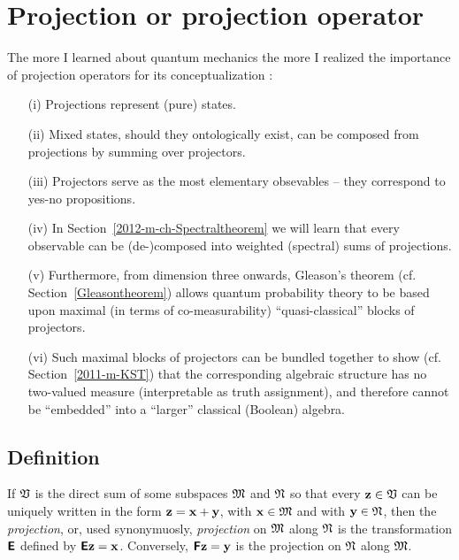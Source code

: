 \section{Projection or projection operator}
\label{2011-m-projec}

The more I learned about quantum mechanics the more
I realized the importance of projection operators for its conceptualization \cite{v-neumann-49,v-neumann-55,birkhoff-36}:
\begin{itemize}
\item[(i)]
Projections represent (pure) states.
\item[(ii)]
Mixed states, should they ontologically exist, can be composed from projections by summing over projectors.
\item[(iii)]
Projectors serve as the most elementary obsevables -- they correspond to yes-no propositions.
\item[(iv)]
In Section~\ref{2012-m-ch-Spectraltheorem} we will learn
that every observable can be (de-)composed into weighted (spectral) sums of projections.
\item[(v)]
Furthermore, from dimension three onwards, Gleason's theorem (cf. Section~\ref{Gleasontheorem}) allows
quantum probability theory to be based upon maximal (in terms of co-measurability) ``quasi-classical''
blocks of projectors.
\item[(vi)]
Such maximal blocks of projectors can be bundled together to show (cf. Section~\ref{2011-m-KST})
that the corresponding algebraic
structure has no two-valued measure (interpretable as truth assignment), and
therefore cannot be ``embedded'' into a ``larger'' classical (Boolean) algebra.
\end{itemize}



\subsection{Definition}
If ${\frak V}$ is the direct sum of some subspaces
${\frak M}$
and
${\frak N}$
so that every ${\bf z} \in {\frak V}$ can be uniquely written in the form
$
{\bf z}
=
{\bf x}
+
{\bf y}
$, with
${\bf x} \in {\frak M}$
and with
${\bf y} \in {\frak N}$,
then
the {\em projection}, or, used synonymuosly,
{\em projection}
on ${\frak M}$
along ${\frak N}$ is the transformation $\textsf{\textbf{E}}$
defined by $\textsf{\textbf{E}}{\bf z}={\bf x}$.
Conversely,
 $\textsf{\textbf{F}}{\bf z}={\bf y}$  is the projection
on ${\frak N}$
along ${\frak M}$.

